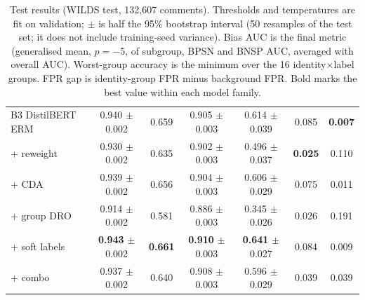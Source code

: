 \begin{table}[t]
{\begin{tabular}{lcccccc}
\midrule
B3 DistilBERT ERM & 0.940 {\scriptsize$\pm$0.002} & 0.659 & 0.905 {\scriptsize$\pm$0.003} & 0.614 {\scriptsize$\pm$0.039} & 0.085 & \textbf{0.007}\\
\quad + reweight & 0.930 {\scriptsize$\pm$0.002} & 0.635 & 0.902 {\scriptsize$\pm$0.003} & 0.496 {\scriptsize$\pm$0.037} & \textbf{0.025} & 0.110\\
\quad + CDA & 0.939 {\scriptsize$\pm$0.002} & 0.656 & 0.904 {\scriptsize$\pm$0.003} & 0.606 {\scriptsize$\pm$0.029} & 0.075 & 0.011\\
\quad + group DRO & 0.914 {\scriptsize$\pm$0.002} & 0.581 & 0.886 {\scriptsize$\pm$0.003} & 0.345 {\scriptsize$\pm$0.026} & 0.026 & 0.191\\
\quad + soft labels & \textbf{0.943} {\scriptsize$\pm$0.002} & \textbf{0.661} & \textbf{0.910} {\scriptsize$\pm$0.003} & \textbf{0.641} {\scriptsize$\pm$0.027} & 0.084 & 0.009\\
\quad + combo & 0.937 {\scriptsize$\pm$0.002} & 0.640 & 0.908 {\scriptsize$\pm$0.003} & 0.596 {\scriptsize$\pm$0.029} & 0.039 & 0.039\\
\bottomrule\end{tabular}}
\caption{Test results (WILDS test, 132,607 comments). Thresholds and temperatures are fit on validation; $\pm$ is half the 95\% bootstrap interval (50 resamples of the test set; it does not include training-seed variance). Bias AUC is the \citet{borkan2019nuanced} final metric (generalised mean, $p{=}{-}5$, of subgroup, BPSN and BNSP AUC, averaged with overall AUC). Worst-group accuracy is the minimum over the 16 identity$\times$label groups. FPR gap is identity-group FPR minus background FPR. Bold marks the best value within each model family.}\label{tab:main}
\end{table}